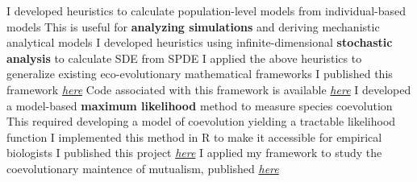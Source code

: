 \documentclass[9pt]{developercv} %
\begin{document}
\begin{entrylist}
        {\vspace{-10 pt}\begin{outline}[itemize]
            \1 I developed heuristics to calculate population-level models from individual-based models
                \vspace{-6 pt}\2[$\cdot$] This is useful for \textbf{analyzing simulations} and deriving mechanistic analytical models
            \vspace{-6 pt}\1 I developed heuristics using infinite-dimensional \textbf{stochastic analysis} to calculate SDE from SPDE
            \vspace{-6 pt}\1 I applied the above heuristics to generalize existing eco-evolutionary mathematical frameworks
                \vspace{-6 pt}\2[$\cdot$] I published this framework \emph{\href{https://doi.org/10.1016/j.jtbi.2021.110660}{here}}
                \vspace{-3 pt}\2[$\cdot$] Code associated with this framework is available \emph{\href{https://github.com/bobweek/white.noise.community.ecology}{here}}
            \vspace{-6 pt} \1 I developed a model-based \textbf{maximum likelihood} method to measure species coevolution
                \vspace{-6 pt}\2[$\cdot$] This required developing a model of coevolution yielding a tractable likelihood function
                \vspace{-3 pt}\2[$\cdot$] I implemented this method in R to make it accessible for empirical biologists
                \vspace{-3 pt}\2[$\cdot$] I published this project \emph{\href{https://doi.org/10.1111/ele.13231}{here}}
            \vspace{-6 pt} \1 I applied my framework to study the coevolutionary maintence of mutualism, published \emph{\href{https://doi.org/10.1086/714274}{here}}
        \end{outline}}
\end{entrylist}
\vspace{-20 pt}
\end{document}
